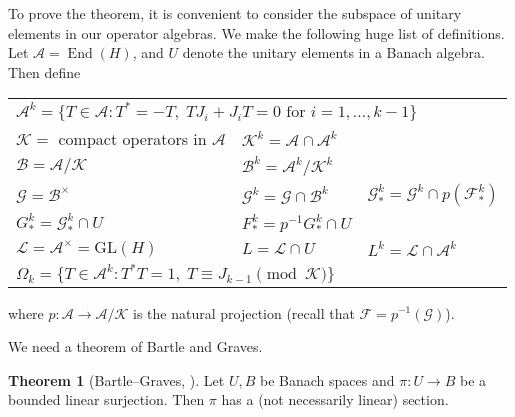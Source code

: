 \documentclass{shortart}
\theoremstyle{definition}
\newtheorem*{thm}{Theorem}
\DeclareMathOperator{\End}{End}
\newcommand\GL{\mathrm{GL}}
\begin{document}
To prove the theorem, it is convenient to consider the subspace of unitary elements in our operator algebras. We make the following huge list of definitions. Let $\mathcal{A} = \End(H)$, and $U$ denote the unitary elements in a Banach algebra. Then define
\begin{center}
  \begin{tabular}{lll}
    \multicolumn{3}{l}{$\mathcal{A}^k = \{T \in \mathcal{A} : T^* = -T,\; T J_i + J_i T = 0\text{ for }i = 1, \ldots, k - 1\}$}\\
    $\mathcal{K} =$ compact operators in $\mathcal{A}$ & $\mathcal{K}^k = \mathcal{A} \cap \mathcal{A}^k$\\
    $\mathcal{B} = \mathcal{A}/\mathcal{K}$ & $\mathcal{B}^k = \mathcal{A}^k/\mathcal{K}^k$\\
    $\mathcal{G} = \mathcal{B}^\times$ & $\mathcal{G}^k = \mathcal{G}\cap \mathcal{B}^k$ & $\mathcal{G}^k_* = \mathcal{G}^k \cap p(\mathcal{F}^k_*)$\\
    $G^k_* = \mathcal{G}^k_* \cap U$ & $F^k_* = p^{-1} G^k_* \cap U$\\
    $\mathcal{L} = \mathcal{A}^\times = \GL(H)$ & $L = \mathcal{L} \cap U$ & $L^k = \mathcal{L} \cap \mathcal{A}^k$\\
    \multicolumn{3}{l}{$\Omega_k = \{T \in \mathcal{A}^k: T^*T = 1,\; T \equiv J_{k - 1} \pmod {\mathcal{K}}\}$}
  \end{tabular}
\end{center}
where $p: \mathcal{A} \to \mathcal{A}/\mathcal{K}$ is the natural projection (recall that $\mathcal{F} = p^{-1}(\mathcal{G})$).

We need a theorem of Bartle and Graves.
\begin{thm}[Bartle--Graves, {\cite{bartlegraves52}}] %
  Let $U, B$ be Banach spaces and $\pi: U \to B$ be a bounded linear surjection. Then $\pi$ has a (not necessarily linear) section.
\end{thm}
\end{document}
